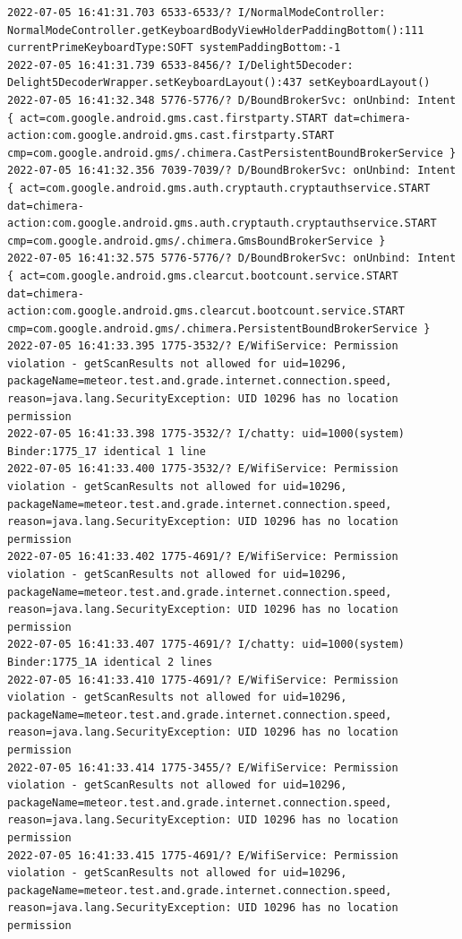 \documentclass[a4paper,12pt]{book}
\begin{document}
\begin{lstlisting}
2022-07-05 16:41:31.703 6533-6533/? I/NormalModeController: NormalModeController.getKeyboardBodyViewHolderPaddingBottom():111 currentPrimeKeyboardType:SOFT systemPaddingBottom:-1
2022-07-05 16:41:31.739 6533-8456/? I/Delight5Decoder: Delight5DecoderWrapper.setKeyboardLayout():437 setKeyboardLayout()
2022-07-05 16:41:32.348 5776-5776/? D/BoundBrokerSvc: onUnbind: Intent { act=com.google.android.gms.cast.firstparty.START dat=chimera-action:com.google.android.gms.cast.firstparty.START cmp=com.google.android.gms/.chimera.CastPersistentBoundBrokerService }
2022-07-05 16:41:32.356 7039-7039/? D/BoundBrokerSvc: onUnbind: Intent { act=com.google.android.gms.auth.cryptauth.cryptauthservice.START dat=chimera-action:com.google.android.gms.auth.cryptauth.cryptauthservice.START cmp=com.google.android.gms/.chimera.GmsBoundBrokerService }
2022-07-05 16:41:32.575 5776-5776/? D/BoundBrokerSvc: onUnbind: Intent { act=com.google.android.gms.clearcut.bootcount.service.START dat=chimera-action:com.google.android.gms.clearcut.bootcount.service.START cmp=com.google.android.gms/.chimera.PersistentBoundBrokerService }
2022-07-05 16:41:33.395 1775-3532/? E/WifiService: Permission violation - getScanResults not allowed for uid=10296, packageName=meteor.test.and.grade.internet.connection.speed, reason=java.lang.SecurityException: UID 10296 has no location permission
2022-07-05 16:41:33.398 1775-3532/? I/chatty: uid=1000(system) Binder:1775_17 identical 1 line
2022-07-05 16:41:33.400 1775-3532/? E/WifiService: Permission violation - getScanResults not allowed for uid=10296, packageName=meteor.test.and.grade.internet.connection.speed, reason=java.lang.SecurityException: UID 10296 has no location permission
2022-07-05 16:41:33.402 1775-4691/? E/WifiService: Permission violation - getScanResults not allowed for uid=10296, packageName=meteor.test.and.grade.internet.connection.speed, reason=java.lang.SecurityException: UID 10296 has no location permission
2022-07-05 16:41:33.407 1775-4691/? I/chatty: uid=1000(system) Binder:1775_1A identical 2 lines
2022-07-05 16:41:33.410 1775-4691/? E/WifiService: Permission violation - getScanResults not allowed for uid=10296, packageName=meteor.test.and.grade.internet.connection.speed, reason=java.lang.SecurityException: UID 10296 has no location permission
2022-07-05 16:41:33.414 1775-3455/? E/WifiService: Permission violation - getScanResults not allowed for uid=10296, packageName=meteor.test.and.grade.internet.connection.speed, reason=java.lang.SecurityException: UID 10296 has no location permission
2022-07-05 16:41:33.415 1775-4691/? E/WifiService: Permission violation - getScanResults not allowed for uid=10296, packageName=meteor.test.and.grade.internet.connection.speed, reason=java.lang.SecurityException: UID 10296 has no location permission

\end{lstlisting}
\end{document}
